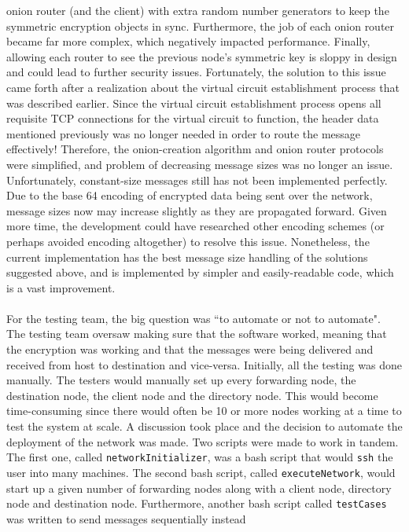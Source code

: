 \documentclass[10pt]{report}
\begin{document}
onion router (and the client) with extra random number generators to keep the symmetric encryption
objects in sync. Furthermore, the job of each onion router became far more complex, which negatively
impacted performance. Finally, allowing each router to see the previous node's symmetric key is
sloppy in design and could lead to further security issues. Fortunately, the solution to this issue
came forth after a realization about the virtual circuit establishment process that was described
earlier. Since the virtual circuit establishment process opens all requisite TCP connections for the
virtual circuit to function, the header data mentioned previously was no longer needed in order to
route the message effectively! Therefore, the onion-creation algorithm and onion router protocols
were simplified, and problem of decreasing message sizes was no longer an issue.\\
Unfortunately, constant-size messages still has not been implemented perfectly. Due to the base 64
encoding of encrypted data being sent over the network, message sizes now may increase slightly as
they are propagated forward. Given more time, the development could have researched other encoding
schemes (or perhaps avoided encoding altogether) to resolve this issue. Nonetheless, the current
implementation has the best message size handling of the solutions suggested above, and is
implemented by simpler and easily-readable code, which is a vast improvement.\\\\
For the testing team, the big question was ``to automate or not to automate". The testing team oversaw
making sure that the software worked, meaning that the encryption was working and that the messages
were being delivered and received from host to destination and vice-versa. Initially, all the
testing was done manually. The testers would manually set up every forwarding node, the destination
node, the client node and the directory node. This would become time-consuming since there would
often be 10 or more nodes working at a time to test the system at scale. A discussion took place and
the decision to automate the deployment of the network was made. Two scripts were made to work in
tandem. The first one, called \texttt{networkInitializer}, was a bash script that would \texttt{ssh}
the user into many machines. The second bash script, called \texttt{executeNetwork}, would start up a given
number of forwarding nodes along with a client node, directory node and destination node.
Furthermore, another bash script called \texttt{testCases} was written to send messages sequentially instead
\end{document}
